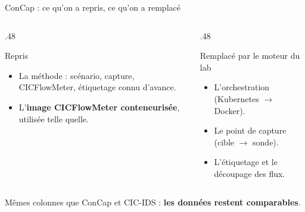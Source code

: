 \documentclass[aspectratio=169,11pt,xcolor=table]{beamer}
\begin{document}
\begin{frame}{ConCap : ce qu'on a repris, ce qu'on a remplacé}
  \begin{columns}[T]
    \begin{column}{.48\linewidth}
      \begin{block}{Repris}
        \begin{itemize}
          \item La méthode : scénario, capture, CICFlowMeter, étiquetage connu d'avance.
          \item L'\textbf{image CICFlowMeter conteneurisée}, utilisée telle quelle.
        \end{itemize}
      \end{block}
    \end{column}
    \begin{column}{.48\linewidth}
      \begin{block}{Remplacé par le moteur du lab}
        \begin{itemize}
          \item L'orchestration (Kubernetes $\rightarrow$ Docker).
          \item Le point de capture (cible $\rightarrow$ sonde).
          \item L'étiquetage et le découpage des flux.
        \end{itemize}
      \end{block}
    \end{column}
  \end{columns}
  \vfill
  Mêmes colonnes que ConCap et CIC-IDS : \textbf{les données restent comparables}.
\end{frame}
\end{document}
